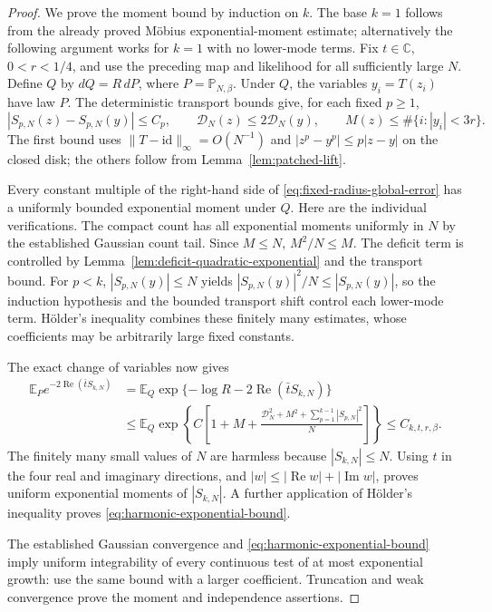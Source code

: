 \documentclass[11pt,a4paper]{article}
\numberwithin{equation}{section}
\theoremstyle{definition}
\theoremstyle{remark}
\newcommand{\E}{\mathbb E}
\newcommand{\Pbb}{\mathbb P}
\newcommand{\C}{\mathbb C}
\begin{document}
\begin{proof}
We prove the moment bound by induction on $k$. The base $k=1$ follows
from the already proved M\"obius exponential-moment estimate; alternatively
the following argument works for $k=1$ with no lower-mode terms.
Fix $t\in\C$, $0<r<1/4$, and use the preceding map and likelihood for
all sufficiently large $N$. Define $Q$ by $dQ=R\,dP$, where
$P=\Pbb_{N,\beta}$. Under $Q$, the variables $y_i=T(z_i)$ have law $P$.
The deterministic transport bounds give, for each fixed $p\geq1$,
\[
 |S_{p,N}(z)-S_{p,N}(y)|\leq C_p,
 \qquad \mathcal D_N(z)\leq2\mathcal D_N(y),
 \qquad M(z)\leq\#\{i:|y_i|<3r\}.
\]
The first bound uses $\|T-\mathrm{id}\|_\infty=O(N^{-1})$ and
$|z^p-y^p|\leq p|z-y|$ on the closed disk; the others follow from
Lemma~\ref{lem:patched-lift}.

Every constant multiple of the right-hand side of
\eqref{eq:fixed-radius-global-error} has a uniformly bounded exponential
moment under $Q$. Here are the individual verifications. The compact
count has all exponential moments uniformly in $N$ by the established
Gaussian count tail. Since $M\leq N$, $M^2/N\leq M$. The deficit term
is controlled by Lemma~\ref{lem:deficit-quadratic-exponential} and the
transport bound. For $p<k$, $|S_{p,N}(y)|\leq N$ yields
$|S_{p,N}(y)|^2/N\leq|S_{p,N}(y)|$, so the induction hypothesis and
the bounded transport shift control each lower-mode term. H\"older's
inequality combines these finitely many estimates, whose coefficients
may be arbitrarily large fixed constants.

The exact change of variables now gives
\begin{align*}
 \E_P e^{-2\operatorname{Re}(\bar t S_{k,N})}
 &=\E_Q\exp\{-\log R-2\operatorname{Re}(\bar tS_{k,N})\}\\
 &\leq \E_Q\exp\!\left\{C\left[1+M+
   \frac{\mathcal D_N^2+M^2+
                     \sum_{p=1}^{k-1}|S_{p,N}|^2}{N}\right]\right\}
 \leq C_{k,t,r,\beta}.
\end{align*}
The finitely many small values of $N$ are harmless because $|S_{k,N}|\leq N$.
Using $t$ in the four real and imaginary directions, and
$|w|\leq|\operatorname{Re}w|+|\operatorname{Im}w|$, proves uniform
exponential moments of $|S_{k,N}|$. A further application of
H\"older's inequality proves \eqref{eq:harmonic-exponential-bound}.

The established Gaussian convergence and
\eqref{eq:harmonic-exponential-bound} imply uniform integrability of
every continuous test of at most exponential growth: use the same bound
with a larger coefficient. Truncation and weak convergence prove the
moment and independence assertions.
\end{proof}
\end{document}
